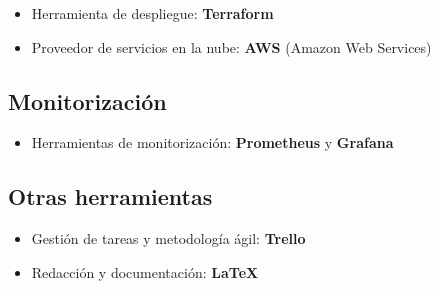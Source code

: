 \begin{itemize}
    \item Herramienta de despliegue: \textbf{Terraform}
    \item Proveedor de servicios en la nube: \textbf{AWS} (Amazon Web Services)
\end{itemize}

\subsection{Monitorización}

\begin{itemize}
    \item Herramientas de monitorización: \textbf{Prometheus} y \textbf{Grafana}
\end{itemize}

\subsection{Otras herramientas}

\begin{itemize}
    \item Gestión de tareas y metodología ágil: \textbf{Trello}
    \item Redacción y documentación: \textbf{LaTeX}
\end{itemize}
